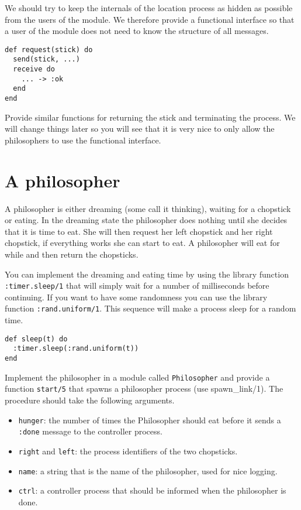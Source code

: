 \documentclass[a4paper,11pt]{article}
\begin{document}
We should try to keep the internals of the location process as hidden
as possible from the users of the module. We therefore provide a
functional interface so that a user of the module does not need to
know the structure of all messages.

\begin{verbatim}
def request(stick) do
  send(stick, ...)
  receive do
    ... -> :ok
  end
end
\end{verbatim}

Provide similar functions for returning the stick and terminating the
process. We will change things later so you will see that it is very
nice to only allow the philosophers to use the functional interface.



\section{A philosopher}

A philosopher is either dreaming (some call it thinking), waiting for
a chopstick or eating. In the dreaming state the philosopher does
nothing until she decides that it is time to eat. She will then
request her left chopstick and her right chopstick, if everything
works she can start to eat. A philosopher will eat for while and then
return the chopsticks.

You can implement the dreaming and eating time by using the library
function {\tt :timer.sleep/1} that will simply wait for a number of
milliseconds before continuing. If you want to have some randomness
you can use the library function {\tt :rand.uniform/1}. This sequence
will make a process sleep for a random time.

\begin{verbatim}
def sleep(t) do 
  :timer.sleep(:rand.uniform(t))
end
\end{verbatim}

Implement the philosopher in a module called {\tt Philosopher} and
provide a function {\tt start/5} that spawns a philosopher
process (use spawn\_link/1). The procedure should take the following arguments.

\begin{itemize}

\item {\tt hunger}: the number of times the Philosopher should eat
  before it sends a {\tt :done} message to the controller process.

\item {\tt right} and {\tt left}: the process identifiers of the two
  chopsticks.

\item {\tt name}: a string that is the name of the philosopher, used
  for nice logging.

\item {\tt ctrl}: a controller process that should be informed when
  the philosopher is done.
\end{itemize}
\end{document}
